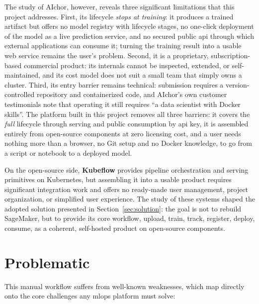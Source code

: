 The study of AIchor, however, reveals three significant limitations that this
project addresses. First, its lifecycle \emph{stops at training}: it produces a
trained artifact but offers no model registry with lifecycle stages, no
one-click deployment of the model as a live prediction service, and no secured
public \gls{api} through which external applications can consume it; turning the
training result into a usable web service remains the user's problem. Second, it
is a proprietary, subscription-based commercial product: its internals cannot be
inspected, extended, or self-maintained, and its cost model does not suit a
small team that simply owns a cluster. Third, its entry barrier remains
technical: submission requires a version-controlled repository and containerized
code, and AIchor's own customer testimonials note that operating it still
requires ``a data scientist with Docker skills''. The platform built in this
project removes all three barriers: it covers the \emph{full} lifecycle through
serving and public consumption by \gls{api} key, it is assembled entirely from
open-source components at zero licensing cost, and a user needs nothing more
than a browser, no Git setup and no Docker knowledge, to go from a script or
notebook to a deployed model.

On the open-source side, \textbf{Kubeflow} provides
pipeline orchestration and serving primitives on Kubernetes, but assembling it
into a usable product requires significant integration work and offers no
ready-made user management, project organization, or simplified user experience.
The study of these systems shaped the adopted solution presented in
Section~\ref{sec:solution}: the goal is not to rebuild SageMaker, but to provide
its core workflow, upload, train, track, register, deploy, consume, as a coherent,
self-hosted product on open-source components.

\section{Problematic}
\label{sec:critique}
This manual workflow suffers from well-known weaknesses, which map directly onto
the core challenges any \gls{mlops} platform must solve:

